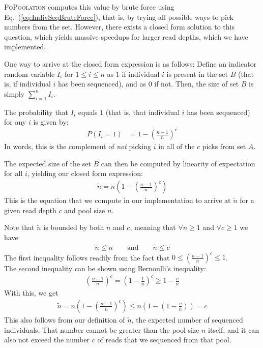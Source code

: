 \documentclass[letterpaper,fontsize=9pt,DIV=12]{scrartcl}
\newcommand\toolname{\textsc}
\newcommand\eqnref[1]{Eq.~(\ref{#1})}
\newcommand{\readdepth}{c}
\begin{document}
\toolname{PoPoolation} computes this value by brute force using \eqnref{eq:IndivSeqBruteForce},
that is, by trying all possible ways to pick numbers from the set.
However, there exists a closed form solution to this question, which yields massive speedups for larger read depths, which we have implemented.

One way to arrive at the closed form expression is as follows:
Define an indicator random variable $I_i$ for $1 \leq i \leq n$ as $1$
if individual $i$ is present in the set $B$ (that is, if individual $i$ has been sequenced), and as $0$ if not.
Then, the size of set $B$ is simply $\sum_{i=1}^{n} I_i$.

The probability that $I_i$ equals $1$ (that is, that individual $i$ has been sequenced)
for any $i$ is given by:
%
\begin{align}
    P(I_i = 1) &= 1-\left( \frac{n-1}{n} \right)^\readdepth
\end{align}
%
In words, this is the complement of \emph{not} picking $i$ in all of the $\readdepth$ picks from set $A$.

The expected size of the set $B$ can then be computed by linearity of expectation for all $i$,
yielding our closed form expression:
%
%
\begin{align}
    \label{eq:NTildeClosedForm}
    \tilde{n} = n \left( 1 - \left( \frac{n-1}{n} \right)^\readdepth \right)
\end{align}
%
This is the equation that we compute in our implementation to arrive at $\tilde{n}$ for a given read depth $\readdepth$ and pool size $n$.

Note that $\tilde{n}$ is bounded by both $n$ and $c$, meaning that $\forall n \geq 1$ and $\forall c \geq 1$ we have
\begin{align}
    \label{eq:NTildeBounds}
     \tilde{n} \leq n \qquad\mbox{and}\qquad \tilde{n} \leq c
\end{align}
The first inequality follows readily from the fact that $0 \le (\frac{n-1}{n})^c \le 1$. \\
The second inequality can be shown using Bernoulli's inequality:
\begin{align}
     \left( \frac{n-1}{n} \right)^c = \left(1 - \frac{1}{n} \right)^c \geq 1 - \frac{c}{n}
\end{align}
With this, we get
\begin{align}
    \tilde{n} = n \left( 1 - \left( \frac{n-1}{n} \right)^\readdepth \right) \leq n \left( 1 - \left( 1 - \frac{c}{n} \right) \right) = c
\end{align}
This also follows from our definition of $\tilde{n}$, the expected number of sequenced individuals. That number cannot be greater than the pool size $n$ itself, and it can also not exceed the number $c$ of reads that we sequenced from that pool.
\end{document}
